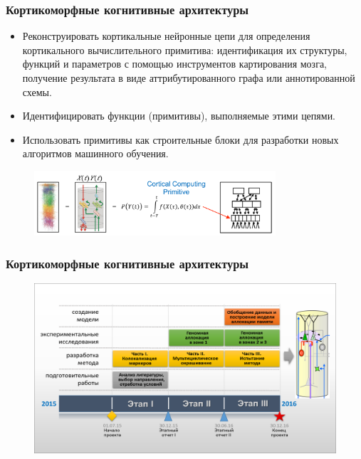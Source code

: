 \documentclass[default]{beamer}
\begin{document}
	\begin{frame}	
		\frametitle{Кортикоморфные когнитивные архитектуры}
		
		\begin{itemize}
			\item Реконструировать кортикальные нейронные цепи для определения кортикального вычислительного примитива: идентификация их структуры, функций и параметров с помощью инструментов картирования мозга, получение результата в виде аттрибутированного графа или аннотированной схемы.
			\item Идентифицировать функции (примитивы), выполняемые этими цепями.
			\item Использовать примитивы как строительные блоки для разработки новых алгоритмов машинного обучения.
		\end{itemize}
		
		\begin{figure}
			\includegraphics[width=0.8\textwidth]{cortic-morph}
		\end{figure}
		
	\end{frame}		
	
	\begin{frame}
		\frametitle{Кортикоморфные когнитивные архитектуры}
		
		\begin{figure}
			\includegraphics[width=\textwidth]{minobr_proj}
		\end{figure}
	\end{frame}	
\end{document}
